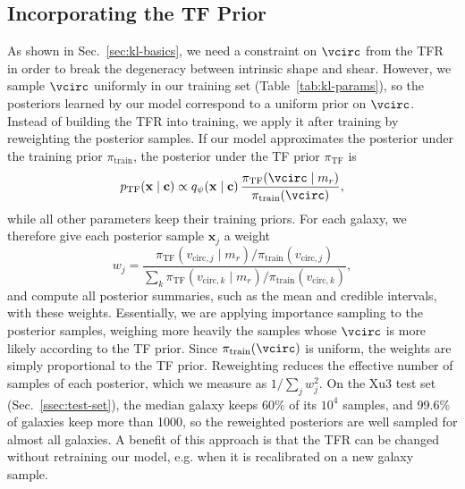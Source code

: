 \subsection{Incorporating the TF Prior}
\label{ssec:tf-prior}
As shown in Sec.~\ref{sec:kl-basics}, we need a constraint on $\vcirc$ from the TFR in order to break the degeneracy between intrinsic shape and shear. However, we sample $\vcirc$ uniformly in our training set (Table~\ref{tab:kl-params}), so the posteriors learned by our model correspond to a uniform prior on $\vcirc$. Instead of building the TFR into training, we apply it after training by reweighting the posterior samples. If our model approximates the posterior under the training prior $\pi_\mathrm{train}$, the posterior under the TF prior $\pi_\mathrm{TF}$ is
\begin{equation}
\label{eqn:tf-reweight}
    p_\mathrm{TF}(\mathbf{x} \mid \mathbf{c}) \propto q_\psi(\mathbf{x} \mid \mathbf{c})\, \frac{\pi_\mathrm{TF}(\vcirc \mid m_r)}{\pi_\mathrm{train}(\vcirc)},
\end{equation}
while all other parameters keep their training priors. For each galaxy, we therefore give each posterior sample $\mathbf{x}_j$ a weight
\begin{equation}
\label{eqn:tf-weights}
    w_j = \frac{\pi_\mathrm{TF}(v_{\mathrm{circ},j} \mid m_r)/\pi_\mathrm{train}(v_{\mathrm{circ},j})}{\sum_k \pi_\mathrm{TF}(v_{\mathrm{circ},k} \mid m_r)/\pi_\mathrm{train}(v_{\mathrm{circ},k})},
\end{equation}
and compute all posterior summaries, such as the mean and credible intervals, with these weights. Essentially, we are applying importance sampling to the posterior samples, weighing more heavily the samples whose $\vcirc$ is more likely according to the TF prior. Since $\pi_\mathrm{train}(\vcirc)$ is uniform, the weights are simply proportional to the TF prior. Reweighting reduces the effective number of samples of each posterior, which we measure as $1/\sum_j w_j^2$. On the Xu3 test set (Sec.~\ref{ssec:test-set}), the median galaxy keeps 60\% of its $10^4$ samples, and 99.6\% of galaxies keep more than 1000, so the reweighted posteriors are well sampled for almost all galaxies. A benefit of this approach is that the TFR can be changed without retraining our model, e.g. when it is recalibrated on a new galaxy sample.

